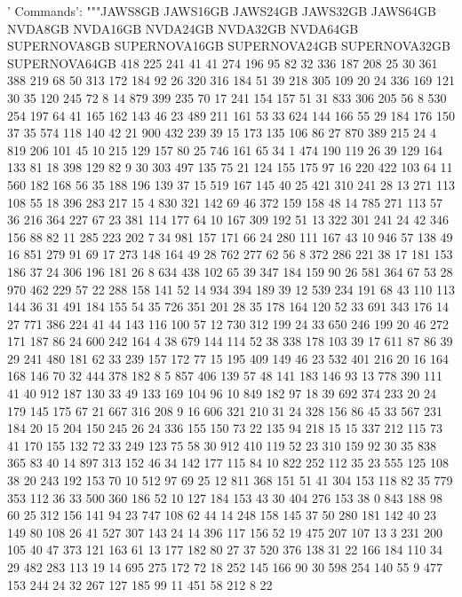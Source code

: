 \begin{pyverbatim}
{	' Commands': """JAWS8GB	JAWS16GB	JAWS24GB	JAWS32GB	JAWS64GB	NVDA8GB	NVDA16GB	NVDA24GB	NVDA32GB	NVDA64GB	SUPERNOVA8GB	SUPERNOVA16GB	SUPERNOVA24GB	SUPERNOVA32GB	SUPERNOVA64GB
	418	225	241	41	41	274	196	95	82	32	336	187	208	25	30
	361	388	219	68	50	313	172	184	92	26	320	316	184	51	39
	218	305	109	20	24	336	169	121	30	35	120	245	72	8	14
	879	399	235	70	17	241	154	157	51	31	833	306	205	56	8
	530	254	197	64	41	165	162	143	46	23	489	211	161	53	33
	624	144	166	55	29	184	176	150	37	35	574	118	140	42	21
	900	432	239	39	15	173	135	106	86	27	870	389	215	24	4
	819	206	101	45	10	215	129	157	80	25	746	161	65	34	1
	474	190	119	26	39	129	164	133	81	18	398	129	82	9	30
	303	497	135	75	21	124	155	175	97	16	220	422	103	64	11
	560	182	168	56	35	188	196	139	37	15	519	167	145	40	25
	421	310	241	28	13	271	113	108	55	18	396	283	217	15	4
	830	321	142	69	46	372	159	158	48	14	785	271	113	57	36
	216	364	227	67	23	381	114	177	64	10	167	309	192	51	13
	322	301	241	24	42	346	156	88	82	11	285	223	202	7	34
	981	157	171	66	24	280	111	167	43	10	946	57	138	49	16
	851	279	91	69	17	273	148	164	49	28	762	277	62	56	8
	372	286	221	38	17	181	153	186	37	24	306	196	181	26	8
	634	438	102	65	39	347	184	159	90	26	581	364	67	53	28
	970	462	229	57	22	288	158	141	52	14	934	394	189	39	12
	539	234	191	68	43	110	113	144	36	31	491	184	155	54	35
	726	351	201	28	35	178	164	120	52	33	691	343	176	14	27
	771	386	224	41	44	143	116	100	57	12	730	312	199	24	33
	650	246	199	20	46	272	171	187	86	24	600	242	164	4	38
	679	144	114	52	38	338	178	103	39	17	611	87	86	39	29
	241	480	181	62	33	239	157	172	77	15	195	409	149	46	23
	532	401	216	20	16	164	168	146	70	32	444	378	182	8	5
	857	406	139	57	48	141	183	146	93	13	778	390	111	41	40
	912	187	130	33	49	133	169	104	96	10	849	182	97	18	39
	692	374	233	20	24	179	145	175	67	21	667	316	208	9	16
	606	321	210	31	24	328	156	86	45	33	567	231	184	20	15
	204	150	245	26	24	336	155	150	73	22	135	94	218	15	15
	337	212	115	73	41	170	155	132	72	33	249	123	75	58	30
	912	410	119	52	23	310	159	92	30	35	838	365	83	40	14
	897	313	152	46	34	142	177	115	84	10	822	252	112	35	23
	555	125	108	38	20	243	192	153	70	10	512	97	69	25	12
	811	368	151	51	41	304	153	118	82	35	779	353	112	36	33
	500	360	186	52	10	127	184	153	43	30	404	276	153	38	0
	843	188	98	60	25	312	156	141	94	23	747	108	62	44	14
	248	158	145	37	50	280	181	142	40	23	149	80	108	26	41
	527	307	143	24	14	396	117	156	52	19	475	207	107	13	3
	231	200	105	40	47	373	121	163	61	13	177	182	80	27	37
	520	376	138	31	22	166	184	110	34	29	482	283	113	19	14
	695	275	172	72	18	252	145	166	90	30	598	254	140	55	9
	477	153	244	24	32	267	127	185	99	11	451	58	212	8	22
}
\end{pyverbatim}
